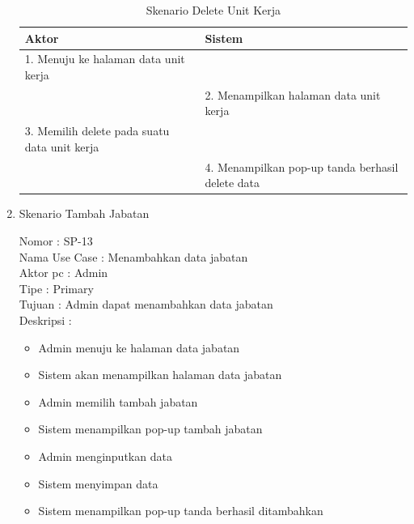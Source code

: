 \begin{enumerate}
\begin{itemize}
\end{itemize}

\begin{table}
	\caption{Skenario Delete Unit Kerja}
	\centering
	\begin{tabular}{ | p{55mm} | p{70mm} |}
		\hline 
		\textbf{Aktor} & \textbf{Sistem} \\
		\hline
		
		1.	Menuju ke halaman data unit kerja &  \\
		
		\hline
		
		&  2.	Menampilkan halaman data unit kerja \\
		
		\hline
		
		3. Memilih delete pada suatu data unit kerja & \\
		
		\hline
		
		& 4.	Menampilkan pop-up tanda berhasil delete data \\
		\hline
		
	\end{tabular}
\end{table}

\newpage
\item Skenario Tambah Jabatan

Nomor \kern 3.6pc : SP-13 \\
Nama Use Case : Menambahkan data jabatan \\
Aktor  pc : Admin \\
Tipe \kern 4.6pc : Primary \\
Tujuan \kern 3.6pc : Admin dapat menambahkan data jabatan \\
Deskripsi \kern 2.5pc : 

\begin{itemize}
	\item Admin menuju ke halaman data jabatan
	\item Sistem akan menampilkan halaman data jabatan
	\item Admin memilih tambah jabatan
	\item Sistem menampilkan pop-up tambah jabatan
	\item Admin menginputkan data
	\item Sistem menyimpan data
	\item Sistem menampilkan pop-up tanda berhasil ditambahkan
	
\end{itemize}


\end{enumerate}
